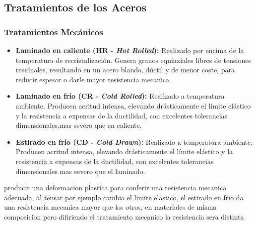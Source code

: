 \subsection{Tratamientos de los Aceros}

\subsubsection{Tratamientos Mecánicos}
\begin{itemize}
    \item \textbf{Laminado en caliente (HR - \textit{Hot Rolled}):} Realizado por encima de la temperatura de recristalización. Genera granos equiaxiales libres de tensiones residuales, resultando en un acero blando, dúctil y de menor coste, para reducir espesor o darle mayor resistencia mecanica.
    \item \textbf{Laminado en frío (CR - \textit{Cold Rolled}):} Realizado a temperatura ambiente. Producen acritud intensa, elevando drásticamente el límite elástico y la resistencia a expensas de la ductilidad, con excelentes tolerancias dimensionales,mas severo que en caliente.
    \item \textbf{Estirado en frío (CD - \textit{Cold Drawn}):} Realizado a temperatura ambiente. Producen acritud intensa, elevando drásticamente el límite elástico y la resistencia a expensas de la ductilidad, con excelentes tolerancias dimensionales mas severo que el laminado.
\end{itemize}
producir una deformacion plastica para conferir una resistencia mecanica adecuada, al tensar por ejemplo cambia el limite elastico,
el estirado en frio da una resistencia mecanica mayor que los otros, en materiales de misma composicion pero difiriendo el tratamiento mecanico la resistencia sera distinta
